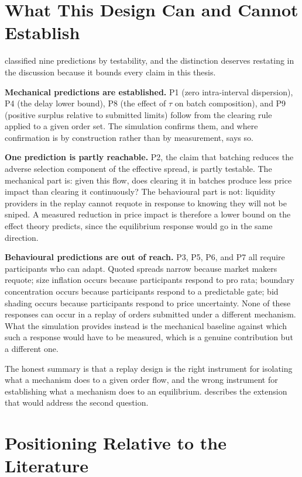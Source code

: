 \section{What This Design Can and Cannot Establish}
\label{sec:testable2}

 classified nine predictions by testability, and
the distinction deserves restating in the discussion because it bounds
every claim in this thesis.

\textbf{Mechanical predictions are established.} P1 (zero
intra-interval dispersion), P4 (the delay lower bound), P8 (the effect
of $\tau$ on batch composition), and P9 (positive surplus relative to
submitted limits) follow from the clearing rule applied to a given order
set. The simulation confirms them, and where confirmation is by
construction rather than by measurement,  says so.

\textbf{One prediction is partly reachable.} P2, the claim that batching
reduces the adverse selection component of the effective spread, is
partly testable. The mechanical part is: given this flow, does clearing
it in batches produce less price impact than clearing it continuously?
The behavioural part is not: liquidity providers in the replay cannot
requote in response to knowing they will not be sniped. A measured
reduction in price impact is therefore a lower bound on the effect
theory predicts, since the equilibrium response would go in the same
direction.

\textbf{Behavioural predictions are out of reach.} P3, P5, P6, and P7
all require participants who can adapt. Quoted spreads narrow because
market makers requote; size inflation occurs because participants
respond to pro rata; boundary concentration occurs because participants
respond to a predictable gate; bid shading occurs because participants
respond to price uncertainty. None of these responses can occur in a
replay of orders submitted under a different mechanism. What the
simulation provides instead is the mechanical baseline against which
such a response would have to be measured, which is a genuine
contribution but a different one.

The honest summary is that a replay design is the right instrument for
isolating what a mechanism does to a given order flow, and the wrong
instrument for establishing what a mechanism does to an equilibrium.
 describes the extension that would address the
second question.

\section{Positioning Relative to the Literature}
\label{sec:positioning}

